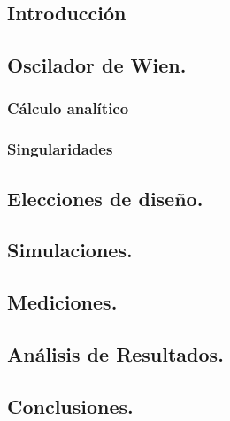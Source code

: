 


\subsection{Introducción}
\subsection{Oscilador de Wien.}
\subsubsection{Cálculo analítico}
\subsubsection{Singularidades}
\subsection{Elecciones de diseño.}
\subsection{Simulaciones.}
\subsection{Mediciones.}
\subsection{Análisis de Resultados.}
\subsection{Conclusiones.}


